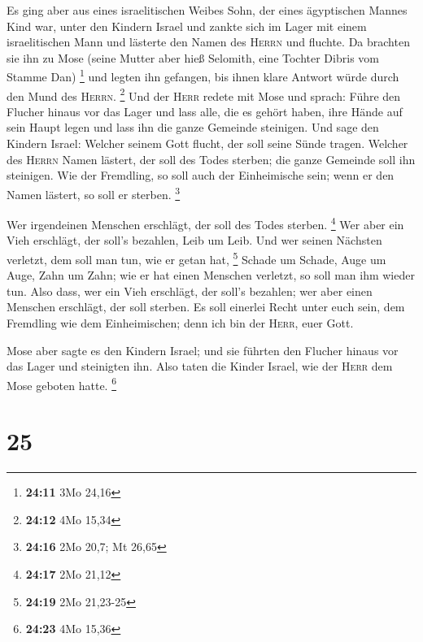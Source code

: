  Es ging aber aus eines israelitischen Weibes Sohn, der
eines ägyptischen Mannes Kind war, unter den Kindern Israel und zankte
sich im Lager mit einem israelitischen Mann  und lästerte
den Namen des \textsc{Herrn} und fluchte. Da brachten sie ihn zu Mose
(seine Mutter aber hieß Selomith, eine Tochter Dibris vom Stamme Dan)
\footnote{\textbf{24:11} 3Mo 24,16}  und legten ihn
gefangen, bis ihnen klare Antwort würde durch den Mund des
\textsc{Herrn}. \footnote{\textbf{24:12} 4Mo 15,34}  Und
der \textsc{Herr} redete mit Mose und sprach:  Führe den
Flucher hinaus vor das Lager und lass alle, die es gehört haben, ihre
Hände auf sein Haupt legen und lass ihn die ganze Gemeinde steinigen.
 Und sage den Kindern Israel: Welcher seinem Gott flucht,
der soll seine Sünde tragen.  Welcher des \textsc{Herrn}
Namen lästert, der soll des Todes sterben; die ganze Gemeinde soll ihn
steinigen. Wie der Fremdling, so soll auch der Einheimische sein; wenn
er den Namen lästert, so soll er sterben. \footnote{\textbf{24:16} 2Mo
  20,7; Mt 26,65}

 Wer irgendeinen Menschen erschlägt, der soll des Todes
sterben. \footnote{\textbf{24:17} 2Mo 21,12}  Wer aber
ein Vieh erschlägt, der soll's bezahlen, Leib um Leib. 
Und wer seinen Nächsten verletzt, dem soll man tun, wie er getan hat,
\footnote{\textbf{24:19} 2Mo 21,23-25}  Schade um Schade,
Auge um Auge, Zahn um Zahn; wie er hat einen Menschen verletzt, so soll
man ihm wieder tun.  Also dass, wer ein Vieh erschlägt,
der soll's bezahlen; wer aber einen Menschen erschlägt, der soll
sterben.  Es soll einerlei Recht unter euch sein, dem
Fremdling wie dem Einheimischen; denn ich bin der \textsc{Herr}, euer
Gott.

 Mose aber sagte es den Kindern Israel; und sie führten
den Flucher hinaus vor das Lager und steinigten ihn. Also taten die
Kinder Israel, wie der \textsc{Herr} dem Mose geboten hatte. \footnote{\textbf{24:23}
  4Mo 15,36}

\hypertarget{section-5}{%
\section{25}\label{section-5}}

